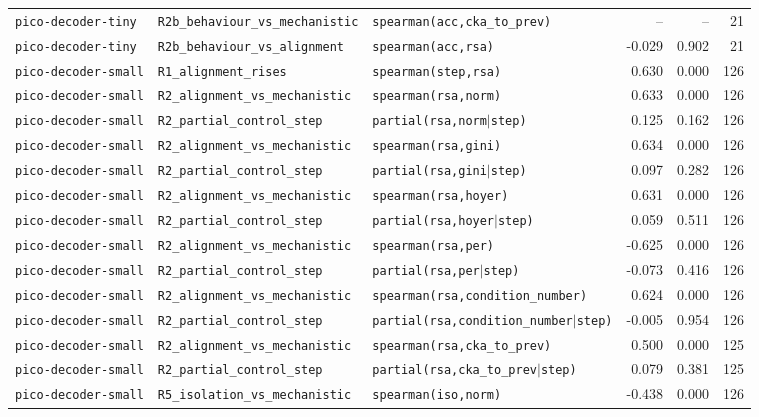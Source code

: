 \begin{longtable}{lllrrr}
\texttt{pico-decoder-tiny} & \texttt{R2b\_behaviour\_vs\_mechanistic} & \texttt{spearman(acc,cka\_to\_prev)} & -- & -- & 21 \\
\texttt{pico-decoder-tiny} & \texttt{R2b\_behaviour\_vs\_alignment} & \texttt{spearman(acc,rsa)} & -0.029 & 0.902 & 21 \\
\texttt{pico-decoder-small} & \texttt{R1\_alignment\_rises} & \texttt{spearman(step,rsa)} & 0.630 & 0.000 & 126 \\
\texttt{pico-decoder-small} & \texttt{R2\_alignment\_vs\_mechanistic} & \texttt{spearman(rsa,norm)} & 0.633 & 0.000 & 126 \\
\texttt{pico-decoder-small} & \texttt{R2\_partial\_control\_step} & \texttt{partial(rsa,norm$\mid$step)} & 0.125 & 0.162 & 126 \\
\texttt{pico-decoder-small} & \texttt{R2\_alignment\_vs\_mechanistic} & \texttt{spearman(rsa,gini)} & 0.634 & 0.000 & 126 \\
\texttt{pico-decoder-small} & \texttt{R2\_partial\_control\_step} & \texttt{partial(rsa,gini$\mid$step)} & 0.097 & 0.282 & 126 \\
\texttt{pico-decoder-small} & \texttt{R2\_alignment\_vs\_mechanistic} & \texttt{spearman(rsa,hoyer)} & 0.631 & 0.000 & 126 \\
\texttt{pico-decoder-small} & \texttt{R2\_partial\_control\_step} & \texttt{partial(rsa,hoyer$\mid$step)} & 0.059 & 0.511 & 126 \\
\texttt{pico-decoder-small} & \texttt{R2\_alignment\_vs\_mechanistic} & \texttt{spearman(rsa,per)} & -0.625 & 0.000 & 126 \\
\texttt{pico-decoder-small} & \texttt{R2\_partial\_control\_step} & \texttt{partial(rsa,per$\mid$step)} & -0.073 & 0.416 & 126 \\
\texttt{pico-decoder-small} & \texttt{R2\_alignment\_vs\_mechanistic} & \texttt{spearman(rsa,condition\_number)} & 0.624 & 0.000 & 126 \\
\texttt{pico-decoder-small} & \texttt{R2\_partial\_control\_step} & \texttt{partial(rsa,condition\_number$\mid$step)} & -0.005 & 0.954 & 126 \\
\texttt{pico-decoder-small} & \texttt{R2\_alignment\_vs\_mechanistic} & \texttt{spearman(rsa,cka\_to\_prev)} & 0.500 & 0.000 & 125 \\
\texttt{pico-decoder-small} & \texttt{R2\_partial\_control\_step} & \texttt{partial(rsa,cka\_to\_prev$\mid$step)} & 0.079 & 0.381 & 125 \\
\texttt{pico-decoder-small} & \texttt{R5\_isolation\_vs\_mechanistic} & \texttt{spearman(iso,norm)} & -0.438 & 0.000 & 126 \\

\end{longtable}
